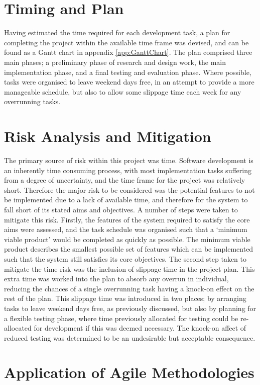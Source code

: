 
\section{Timing and Plan}

Having estimated the time required for each development task, a plan for completing the project within the available time frame was devised, and can be found as a Gantt chart in appendix \ref{app:GanttChart}. The plan comprised three main phases; a preliminary phase of research and design work, the main implementation phase, and a final testing and evaluation phase. Where possible, tasks were organised to leave weekend days free, in an attempt to provide a more manageable schedule, but also to allow some slippage time each week for any overrunning tasks.


\section{Risk Analysis and Mitigation}

The primary source of risk within this project was time. Software development is an inherently time consuming process, with most implementation tasks suffering from a degree of uncertainty, and the time frame for the project was relatively short. Therefore the major risk to be considered was the potential features to not be implemented due to a lack of available time, and therefore for the system to fall short of its stated aims and objectives. A number of steps were taken to mitigate this risk. Firstly, the features of the system required to satisfy the core aims were assessed, and the task schedule was organised such that a `minimum viable product' would be completed as quickly as possible. The minimum viable product describes the smallest possible set of features which can be implemented such that the system still satisfies its core objectives. The second step taken to mitigate the time-risk was the inclusion of slippage time in the project plan. This extra time was worked into the plan to absorb any overrun in individual, reducing the chances of a single overrunning task having a knock-on effect on the rest of the plan. This slippage time was introduced in two places; by arranging tasks to leave weekend days free, as previously discussed, but also by planning for a flexible testing phase, where time previously allocated for testing could be re-allocated for development if this was deemed necessary. The knock-on affect of reduced testing was determined to be an undesirable but acceptable consequence.




\section{Application of Agile Methodologies} \label{Agile}



